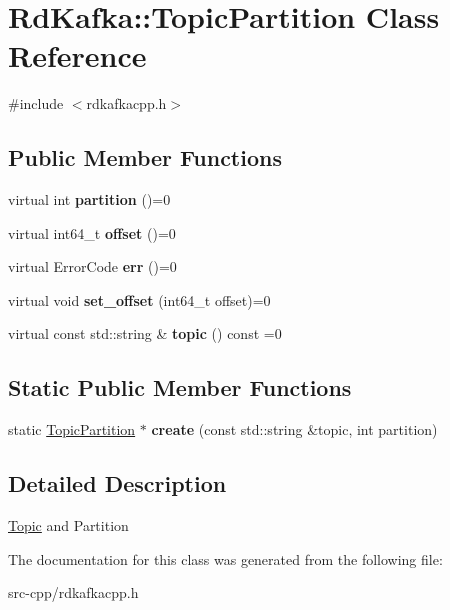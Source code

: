 \hypertarget{classRdKafka_1_1TopicPartition}{\section{Rd\-Kafka\-:\-:Topic\-Partition Class Reference}
\label{classRdKafka_1_1TopicPartition}
}


{\ttfamily \#include $<$rdkafkacpp.\-h$>$}

\subsection*{Public Member Functions}
\begin{DoxyCompactItemize}
\item 
\hypertarget{classRdKafka_1_1TopicPartition_acd4f5a99552aea181ab565d4220e00cb}{virtual int {\bfseries partition} ()=0}\label{classRdKafka_1_1TopicPartition_acd4f5a99552aea181ab565d4220e00cb}

\item 
\hypertarget{classRdKafka_1_1TopicPartition_a233ad9b5b4441073bc10fe0784c141bf}{virtual int64\-\_\-t {\bfseries offset} ()=0}\label{classRdKafka_1_1TopicPartition_a233ad9b5b4441073bc10fe0784c141bf}

\item 
\hypertarget{classRdKafka_1_1TopicPartition_a2a6c8e5ad6c373dd1362c5df4e528d44}{virtual Error\-Code {\bfseries err} ()=0}\label{classRdKafka_1_1TopicPartition_a2a6c8e5ad6c373dd1362c5df4e528d44}

\item 
\hypertarget{classRdKafka_1_1TopicPartition_a8dfaa301f6ee2b079ba5ba27d2df8c26}{virtual void {\bfseries set\-\_\-offset} (int64\-\_\-t offset)=0}\label{classRdKafka_1_1TopicPartition_a8dfaa301f6ee2b079ba5ba27d2df8c26}

\item 
\hypertarget{classRdKafka_1_1TopicPartition_a1e1d34726a70a1109f67202f74d1e6b4}{virtual const std\-::string \& {\bfseries topic} () const =0}\label{classRdKafka_1_1TopicPartition_a1e1d34726a70a1109f67202f74d1e6b4}

\end{DoxyCompactItemize}
\subsection*{Static Public Member Functions}
\begin{DoxyCompactItemize}
\item 
\hypertarget{classRdKafka_1_1TopicPartition_acb929236c0604a595e53154c3552d399}{static \hyperlink{classRdKafka_1_1TopicPartition}{Topic\-Partition} $\ast$ {\bfseries create} (const std\-::string \&topic, int partition)}\label{classRdKafka_1_1TopicPartition_acb929236c0604a595e53154c3552d399}

\end{DoxyCompactItemize}


\subsection{Detailed Description}
\hyperlink{classRdKafka_1_1Topic}{Topic} and Partition 

The documentation for this class was generated from the following file\-:\begin{DoxyCompactItemize}
\item 
src-\/cpp/rdkafkacpp.\-h\end{DoxyCompactItemize}
